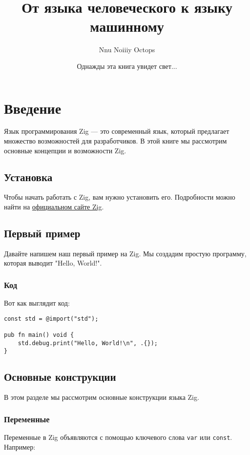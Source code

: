 \documentclass[a4paper, twoside, openany]{book}
\title{От языка человеческого к языку машинному}
\author{Nnu Noiiiy Octops}
\date{Однажды эта книга увидет свет...}
\begin{document}
\maketitle

\tableofcontents

\chapter{Введение}
 \fontsize{14pt}{14pt}\selectfont
 Язык программирования Zig — это современный язык, который предлагает множество возможностей
 для разработчиков. В этой книге мы рассмотрим основные концепции и возможности Zig.

\section{Установка}
 \fontsize{14pt}{14pt}\selectfont
 Чтобы начать работать с Zig, вам нужно установить его. Подробности можно найти на
 \href{https://ziglang.org/download/}{официальном сайте Zig}.

\section{Первый пример}
 \fontsize{14pt}{14pt}\selectfont
Давайте напишем наш первый пример на Zig. Мы создадим простую программу, которая выводит "Hello, World!".

\subsection{Код}
 \fontsize{14pt}{14pt}\selectfont
Вот как выглядит код:

\begin{lstlisting}
const std = @import("std");

pub fn main() void {
    std.debug.print("Hello, World!\n", .{});
}
\end{lstlisting}

\section{Основные конструкции}
 \fontsize{14pt}{14pt}\selectfont
В этом разделе мы рассмотрим основные конструкции языка Zig.

\subsection{Переменные}
 \fontsize{14pt}{14pt}\selectfont
Переменные в Zig объявляются с помощью ключевого слова \texttt{var} или \texttt{const}. Например:
\end{document}
